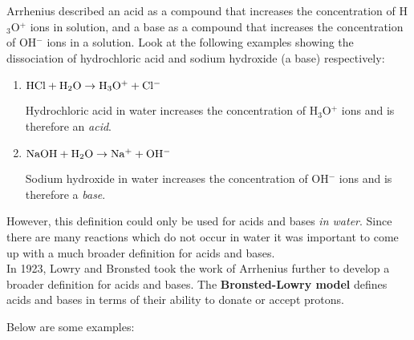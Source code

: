 Arrhenius described an acid as a compound that increases the concentration of H$_{3}$O$^{+}$ ions in solution, and a base as a compound that increases the concentration of OH$^{-}$ ions in a solution. Look at the following examples showing the dissociation of hydrochloric acid and sodium hydroxide (a base) respectively:

\begin{enumerate}
\item{
$\rm{HCl + H_{2}O \rightarrow H_{3}O^{+} + Cl^{-}}$

Hydrochloric acid in water increases the concentration of H$_{3}$O$^{+}$ ions and is therefore an \textit{acid}.}

\item{$\rm{NaOH + H_{2}O \rightarrow Na^{+} + OH^{-}}$

Sodium hydroxide in water increases the concentration of OH$^{-}$ ions and is therefore a \textit{base}.}
\end{enumerate}

However, this definition could only be used for acids and bases \textit{in water}. Since there are many reactions which do not occur in water it was important to come up with a much broader definition for acids and bases. \\

In 1923, Lowry and Bronsted took the work of Arrhenius further to develop a broader definition for acids and bases. The \textbf{Bronsted-Lowry model} defines acids and bases in terms of their ability to donate or accept protons.


Below are some examples:

